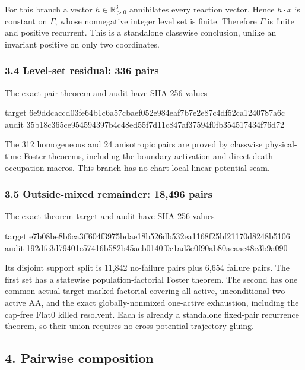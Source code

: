 For this branch a vector \(h\in\mathbb R_{>0}^3\) annihilates every
reaction vector. Hence \(h\cdot x\) is constant on \(\Gamma\), whose
nonnegative integer level set is finite. Therefore \(\Gamma\) is finite
and positive recurrent. This is a standalone classwise conclusion,
unlike an invariant positive on only two coordinates.

\subsubsection{3.4 Level-set residual: 336
pairs}

The exact pair theorem and audit have SHA-256 values

\begin{CodeBlock}
target 6e9ddcaccd03fe64b1c6a57cbaef052e984eaf7b7e2e87c4df52ca1240787a6c
audit  35b18c365ce954594397b4c48ed55f7d11c847af37594f0fb354517434f76d72
\end{CodeBlock}

The 312 homogeneous and 24 anisotropic pairs are proved by classwise
physical-time Foster theorems, including the boundary activation and
direct death occupation macros. This branch has no chart-local
linear-potential seam.

\subsubsection{3.5 Outside-mixed remainder: 18,496
pairs}

The exact theorem target and audit have SHA-256 values

\begin{CodeBlock}
target e7b08be8b6ca3ff604f3975bdae18b526db532ea1168f25bf21170d8248b5106
audit  192dfc3d79401c57416b582b45aeb0140f0c1ad3e0f90ab80acaae48e3b9a090
\end{CodeBlock}

Its disjoint support split is 11,842 no-failure pairs plus 6,654 failure
pairs. The first set has a statewise population-factorial Foster
theorem. The second has one common actual-target marked factorial
covering all-active, unconditional two-active AA, and the exact
globally-nonmixed one-active exhaustion, including the cap-free Flat0
killed resolvent. Each is already a standalone fixed-pair recurrence
theorem, so their union requires no cross-potential trajectory gluing.

\subsection{4. Pairwise composition}

